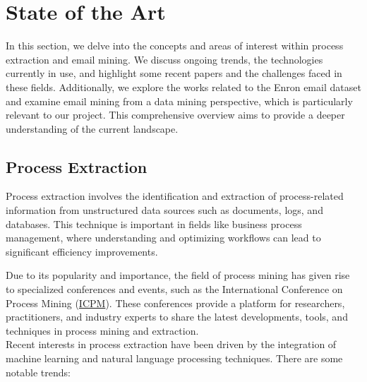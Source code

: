 \chapter{State of the Art}
\label{chp:state_of_the_art}

 In this section, we delve into the concepts and areas of interest within process extraction and email mining. We discuss ongoing trends, the technologies currently in use, and highlight some recent papers and the challenges faced in these fields. Additionally, we explore the works related to the Enron email dataset and examine email mining from a data mining perspective, which is particularly relevant to our project. This comprehensive overview aims to provide a deeper understanding of the current landscape.

\section{Process Extraction}
\label{sec:process_extraction}

 Process extraction involves the identification and extraction of process-related information from unstructured data sources such as documents, logs, and databases. This technique is important in fields like business process management, where understanding and optimizing workflows can lead to significant efficiency improvements.
 
 Due to its popularity and importance, the field of process mining has given rise to specialized conferences and events, such as the International Conference on Process Mining (\href{https://icpmconference.org/}{ICPM}). These conferences provide a platform for researchers, practitioners, and industry experts to share the latest developments, tools, and techniques in process mining and extraction.\\
 
 Recent interests in process extraction have been driven by the integration of machine learning and natural language processing techniques. There are some notable trends:

